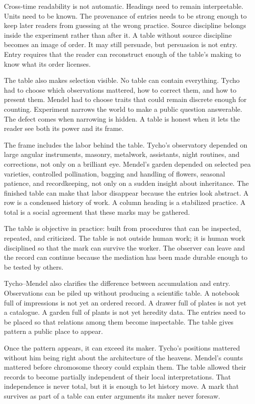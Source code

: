 Cross-time readability is not automatic. Headings need to remain
interpretable. Units need to be known.
The provenance of entries needs to be strong enough to keep later readers
from guessing at the wrong practice. Source discipline belongs inside the
experiment rather than after it. A table without source discipline becomes
an image of order. It may still persuade, but persuasion is not entry.
Entry requires that the reader can reconstruct enough of the table's making
to know what its order licenses.

The table also makes selection visible. No table can contain everything.
Tycho had to choose which observations mattered, how to correct them, and
how to present them. Mendel had to choose traits that could remain discrete
enough for counting. Experiment narrows the world to make a public question
answerable.
The defect comes when narrowing is hidden. A table is honest when it lets
the reader see both its power and its frame.

The frame includes the labor behind the table. Tycho's observatory depended
on large angular instruments, masonry, metalwork, assistants, night
routines, and corrections, not only on a brilliant eye. Mendel's garden
depended on selected pea varieties, controlled pollination, bagging and
handling of flowers, seasonal patience, and recordkeeping, not only on a
sudden insight about inheritance. The finished table can make that labor
disappear because the entries look abstract. A row is a condensed history
of work. A column heading is a stabilized practice. A total is a social
agreement that these marks may be gathered.

The table is objective in practice: built from procedures that can be
inspected, repeated, and criticized. The table is
not outside human work; it is human work disciplined so that the mark can
survive the worker. The observer can leave and the record can continue
because the mediation has been made durable enough to be tested by others.

Tycho--Mendel also clarifies the difference between accumulation and entry.
Observations can be piled up without producing a scientific table. A
notebook full of impressions is not yet an ordered record. A drawer full of
plates is not yet a catalogue. A garden full of plants is not yet heredity
data. The entries need to be placed so that relations among them become
inspectable. The table gives pattern a public place to appear.

Once the pattern appears, it can exceed its maker. Tycho's positions
mattered without him being right about the architecture of the heavens.
Mendel's counts mattered before chromosome theory could explain them.
The table allowed their records to become partially independent of their
local interpretations. That independence is never total, but it is enough
to let history move. A mark that survives as part of a table can enter
arguments its maker never foresaw.

